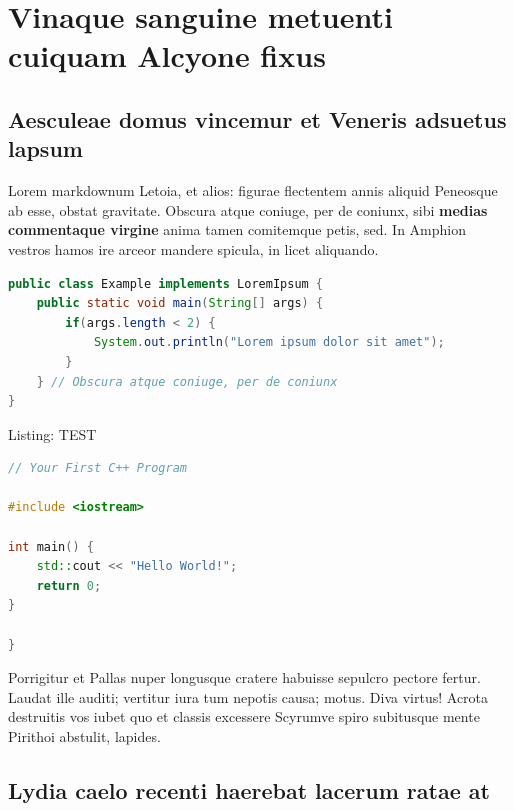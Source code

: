 

\hypertarget{vinaque-sanguine-metuenti-cuiquam-alcyone-fixus}{%
\section{Vinaque sanguine metuenti cuiquam Alcyone
fixus}\label{vinaque-sanguine-metuenti-cuiquam-alcyone-fixus}}

\hypertarget{aesculeae-domus-vincemur-et-veneris-adsuetus-lapsum}{%
\subsection{Aesculeae domus vincemur et Veneris adsuetus
lapsum}\label{aesculeae-domus-vincemur-et-veneris-adsuetus-lapsum}}

Lorem markdownum Letoia, et alios: figurae flectentem annis aliquid
Peneosque ab esse, obstat gravitate. Obscura atque coniuge, per de
coniunx, sibi \textbf{medias commentaque virgine} anima tamen comitemque
petis, sed. In Amphion vestros hamos ire arceor mandere spicula, in
licet aliquando.

\begin{lstlisting}[language=Java]
public class Example implements LoremIpsum {
    public static void main(String[] args) {
        if(args.length < 2) {
            System.out.println("Lorem ipsum dolor sit amet");
        }
    } // Obscura atque coniuge, per de coniunx
}
\end{lstlisting}

Listing: TEST

\begin{lstlisting}[language={C++}]
// Your First C++ Program

#include <iostream>

int main() {
    std::cout << "Hello World!";
    return 0;
}

}
\end{lstlisting}

Porrigitur et Pallas nuper longusque cratere habuisse sepulcro pectore
fertur. Laudat ille auditi; vertitur iura tum nepotis causa; motus. Diva
virtus! Acrota destruitis vos iubet quo et classis excessere Scyrumve
spiro subitusque mente Pirithoi abstulit, lapides.

\hypertarget{lydia-caelo-recenti-haerebat-lacerum-ratae-at}{%
\subsection{Lydia caelo recenti haerebat lacerum ratae
at}\label{lydia-caelo-recenti-haerebat-lacerum-ratae-at}}

